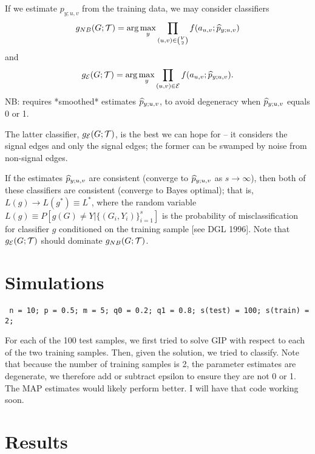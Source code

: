 If we estimate $p_{y;u,v}$ from the training data,
we may consider classifiers
\begin{eqnarray}
g_{NB}(G;\mathcal{T}) = \arg\max_y \prod_{(u,v) \in {V \choose 2}} f(a_{u,v};\widehat{p}_{y;u,v})
\end{eqnarray}
and
\begin{eqnarray}
g_{\mathcal{E}}(G;\mathcal{T}) = \arg\max_y \prod_{(u,v) \in \mathcal{E}} f(a_{u,v};\widehat{p}_{y;u,v}).
\end{eqnarray}
NB: requires *smoothed* estimates $\widehat{p}_{y;u,v}$,
to avoid degeneracy when $\widehat{p}_{y;u,v}$ equals 0 or 1.

The latter classifier, $g_{\mathcal{E}}(G;\mathcal{T})$,
is the best we can hope for -- it considers the signal edges and only the signal edges;
the former can be swamped by noise from non-signal edges.

If the estimates $\widehat{p}_{y;u,v}$ are consistent (converge to $\widehat{p}_{y;u,v}$ as $s \rightarrow \infty$),
then both of these classifiers are consistent (converge to Bayes optimal);
that is, $L(g) \rightarrow L(g^*) \equiv L^*$,
where the random variable $L(g) \equiv P[g(G) \neq Y| \{(G_i,Y_i)\}_{i=1}^s]$
is the probability of misclassification for classifier $g$
conditioned on the training sample [see DGL 1996].
Note that $g_{\mathcal{E}}(G;\mathcal{T})$ should dominate $g_{NB}(G;\mathcal{T})$.


\section{Simulations} %
\label{sec:simulation}

\texttt{
n = 10; %
p = 0.5; %
m = 5;   
q0 = 0.2; %
q1 = 0.8; %
s(test) = 100;  %
s(train) = 2;
}

For each of the 100 test samples, we first tried to solve GIP with respect to each of the two training samples.  Then, given the solution, we tried to classify.  Note that because the number of training samples is 2, the parameter estimates are degenerate, we therefore add or subtract epsilon to ensure they are not 0 or 1.  The MAP estimates would likely perform better.  I will have that code working soon.


\section{Results} %
\label{sec:results}



